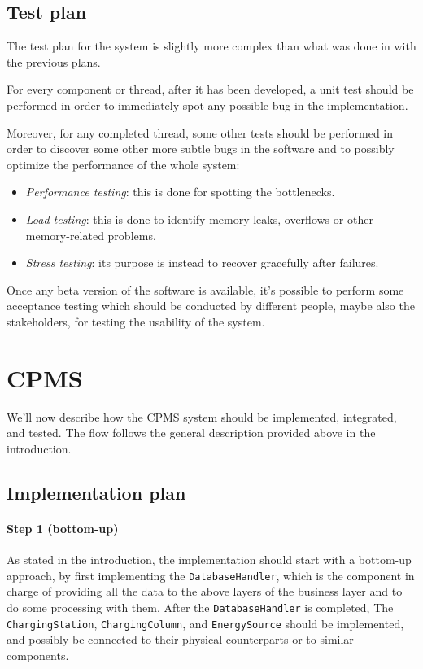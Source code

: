 \subsection{Test plan}

The test plan for the system is slightly more complex than what was done in with the previous plans.\medskip

For every component or thread, after it has been developed, a unit test should be performed in order to immediately spot any possible bug in the implementation.\medskip

Moreover, for any completed thread, some other tests should be performed in order to discover some other more subtle bugs in the software and to possibly optimize the performance of the whole system:
\begin{itemize}
    \item \textit{Performance testing}: this is done for spotting the bottlenecks.
    \item \textit{Load testing}: this is done to identify memory leaks, overflows or other memory-related problems.
    \item \textit{Stress testing}: its purpose is instead to recover gracefully after failures.
\end{itemize}

Once any beta version of the software is available, it's possible to perform some acceptance testing which should be conducted by different people, maybe also the stakeholders, for testing the usability of the system.

\pagebreak

\section{CPMS}

We'll now describe how the CPMS system should be implemented, integrated, and tested. The flow follows the general description provided above in the introduction.

\subsection{Implementation plan}

\paragraph{Step 1 (bottom-up)}\label{cpms:bottomup} As stated in the introduction, the implementation should start with a bottom-up approach, by first implementing the \texttt{DatabaseHandler}, which is the component in charge of providing all the data to the above layers of the business layer and to do some processing with them. After the \texttt{DatabaseHandler} is completed, The \texttt{ChargingStation}, \texttt{ChargingColumn}, and \texttt{EnergySource} should be implemented, and possibly be connected to their physical counterparts or to similar components. 

